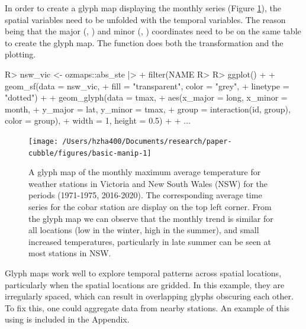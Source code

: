 \documentclass[
  shortnames]{jss}
\begin{document}
In order to create a glyph map displaying the monthly series (Figure \ref{fig:basic-manip}), the spatial variables need to be unfolded with the temporal variables. The reason being that the major (, ) and minor (, ) coordinates need to be on the same table to create the glyph map. The  function does both the transformation and the plotting.

\begin{CodeChunk}
\begin{CodeInput}
R> nsw_vic <- ozmaps::abs_ste |>
+   filter(NAME %
R> 
R> ggplot() +
+   geom_sf(data = nsw_vic,
+           fill = "transparent", color = "grey",
+           linetype = "dotted") +
+   geom_glyph(data = tmax,
+              aes(x_major = long, x_minor = month,
+                  y_major = lat, y_minor = tmax,
+                  group = interaction(id, group), color = group),
+              width = 1, height = 0.5) +
+   ...
\end{CodeInput}
\end{CodeChunk}

\begin{CodeChunk}
\begin{figure}

{\centering \texttt{[image: /Users/hzha400/Documents/research/paper-cubble/figures/basic-manip-1]} 

}

\caption[A glyph map of the monthly maximum average temperature for weather stations in  Victoria and New South Wales (NSW) for the periods (1971-1975, 2016-2020)]{A glyph map of the monthly maximum average temperature for weather stations in  Victoria and New South Wales (NSW) for the periods (1971-1975, 2016-2020). The corresponding average time series for the cobar station are display on the top left corner. From the glyph map we can observe that the monthly trend is similar for all locations (low in the winter, high in the summer), and small increased temperatures, particularly in late summer can be seen at most stations in NSW.}\label{fig:basic-manip}
\end{figure}
\end{CodeChunk}

Glyph maps work well to explore temporal patterns across spatial locations, particularly when the spatial locations are gridded. In this example, they are irregularly spaced, which can result in overlapping glyphs obscuring each other. To fix this, one could aggregate data from nearby stations. An example of this using is included in the Appendix.
\end{document}
